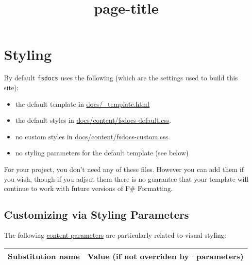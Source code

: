 \documentclass{article}
\title{{page-title}}
\date{}
\begin{document}
\maketitle

\section*{Styling}



By default \texttt{fsdocs} uses the following (which are the settings used to build this site):
\begin{itemize}
\item 

the default template in \href{https://github.com/fsprojects/FSharp.Formatting/blob/master/docs/\_template.html}{docs/\_template.html}

\item 

the default styles in \href{https://github.com/fsprojects/FSharp.Formatting/blob/master/docs/content/fsdocs-default.css}{docs/content/fsdocs-default.css}.

\item 

no custom styles in \href{https://github.com/fsprojects/FSharp.Formatting/blob/master/docs/content/fsdocs-default.css}{docs/content/fsdocs-custom.css}.

\item 

no styling parameters for the default template (see below)

\end{itemize}



For your project, you don't need any of these files. However you can add them if you wish, though if
you adjsut them there is no guarantee that your template will continue to work with future versions of F\# Formatting.
\subsection*{Customizing via Styling Parameters}



The following \href{content.html}{content parameters} are particularly related to visual styling:
\begin{tabular}{|l|l|}\hline
\textbf{Substitution name} & \textbf{Value (if not overriden by --parameters)}\\ \hline\hline
\end{tabular}
\end{document}
